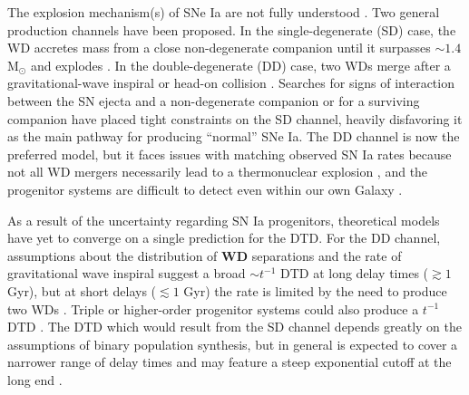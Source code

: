 \documentclass[twocolumn,twocolappendix,linenumbers]{aastex631}
\begin{document}
The explosion mechanism(s) of SNe Ia are not fully understood \citep[for reviews, see][]{Maoz2014-Review,Livio2018-ProgenitorReview,Ruiter2020-ProgenitorReview,Liu2023-SNIaBinaryReview}. Two general production channels have been proposed. In the single-degenerate (SD) case, the WD accretes mass from a close non-degenerate companion until it surpasses $\sim1.4$ M$_\odot$ and explodes \citep{Whelan1973-SDModel,Nomoto1982-SDModel,Yoon2003-SDModel}. In the double-degenerate (DD) case, two WDs merge after a gravitational-wave inspiral \citep{Iben1984-IaBinary,Webbink1984-DDModel,Pakmor2012-WDMerger} or head-on collision \citep{Benz1989-CollisionalDD,Thompson2011-CollisionalDD}. Searches for signs of interaction between the SN ejecta and a non-degenerate companion \citep[e.g.,][]{Panagia2006-RadioEmission,Chomiuk2016-RadioEmission,Fausnaugh2019-EarlyIaLightCurves,Tucker2020-SNeIaSpectra,Dubay2022-SNeIaCSM} or for a surviving companion \citep[e.g.,][]{Schaefer2012-ExCompanionSNR,Do2021-Progenitor1972E,Tucker2023-SN2011fe} have placed tight constraints on the SD channel, heavily disfavoring it as the main pathway for producing ``normal'' SNe Ia. The DD channel is now the preferred model, but it faces issues with matching observed SN Ia rates because not all WD mergers necessarily lead to a thermonuclear explosion \citep[e.g.,][]{NomotoIben1985-DDMergers,SaioNomoto1998-DDMergers,Shen2012-DDMergers}, and the progenitor systems are difficult to detect even within our own Galaxy \citep{RebassaMansergas2019-WhereAreDDProgenitors}.

As a result of the uncertainty regarding SN Ia progenitors, theoretical models have yet to converge on a single prediction for the DTD. For the DD channel, assumptions about the distribution of {\bf WD} separations and the rate of gravitational wave inspiral suggest a broad $\sim t^{-1}$ DTD at long delay times ($\gtrsim 1$ Gyr), but at short delays ($\lesssim 1$ Gyr) the rate is limited by the need to produce two WDs {\bf \citep[see][]{Greggio2005-AnalyticalRates,Maoz2014-Review}}. Triple or higher-order progenitor systems could also produce a $t^{-1}$ DTD \citep{Fang2018-QuadrupleSystems,Rajamuthukumar2023-TripleEvolution}. The DTD which would result from the SD channel depends greatly on the assumptions of binary population synthesis, but in general is expected to cover a narrower range of delay times and may feature a steep exponential cutoff at the long end \citep[e.g.,][]{Greggio2005-AnalyticalRates}.
\end{document}
